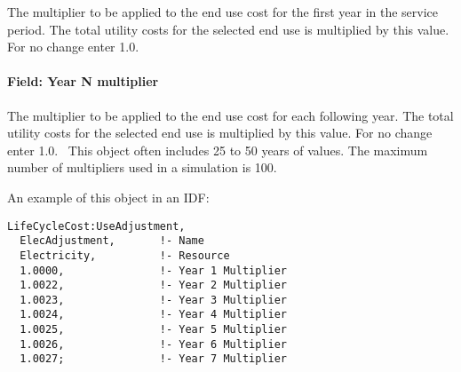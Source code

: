The multiplier to be applied to the end use cost for the first year in the service period. The total utility costs for the selected end use is multiplied by this value. For no change enter 1.0.

\paragraph{Field: Year N multiplier}\label{field-year-n-multiplier}

The multiplier to be applied to the end use cost for each following year. The total utility costs for the selected end use is multiplied by this value. For no change enter 1.0.~ This object often includes 25 to 50 years of values. The maximum number of multipliers used in a simulation is 100.

An example of this object in an IDF:

\begin{lstlisting}
LifeCycleCost:UseAdjustment,
  ElecAdjustment,       !- Name
  Electricity,          !- Resource
  1.0000,               !- Year 1 Multiplier
  1.0022,               !- Year 2 Multiplier
  1.0023,               !- Year 3 Multiplier
  1.0024,               !- Year 4 Multiplier
  1.0025,               !- Year 5 Multiplier
  1.0026,               !- Year 6 Multiplier
  1.0027;               !- Year 7 Multiplier
\end{lstlisting}